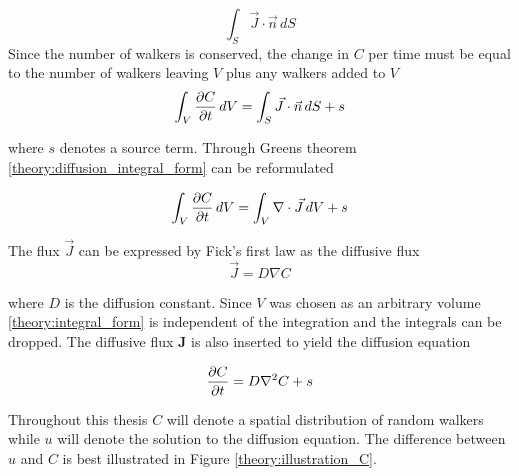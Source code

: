 \begin{equation}
 \int_S\vec{J}\cdot \vec{n}\,dS
\end{equation}
Since the number of walkers is conserved, the change in $C$ per time must be equal to the number of walkers leaving $V$ plus any walkers added to $V$
\begin{equation}\label{theory:diffusion_integral_form}
 \int_V \frac{\partial C}{\partial t}\,dV = \int_S\vec{J}\cdot \vec{n}\,dS + s
\end{equation}

\noindent where $s$ denotes a source term. 
Through Greens theorem \eqref{theory:diffusion_integral_form} can be reformulated

\begin{equation}\label{theory:integral_form}
 \int_V \frac{\partial C}{\partial t}\,dV = \int_V\nabla\cdot\vec{J}\,dV +s
\end{equation}

\noindent The flux $\vec{J}$ can be expressed by Fick's first law as the diffusive flux 
\begin{equation}
 \vec J = D\nabla C
\end{equation}

\noindent where $D$ is the diffusion constant. Since $V$ was chosen as an arbitrary volume \eqref{theory:integral_form} is independent of the integration and the integrals can be dropped. 
The diffusive flux $\mathbf{J}$ is also inserted to yield the diffusion equation

\begin{equation}\label{theory:diffusion_equation}
 \frac{\partial C}{\partial t} = D\nabla^2 C +s
\end{equation}

\noindent Throughout this thesis $C$ will denote a spatial distribution of random walkers while $u$ will denote the solution to the diffusion equation. 
The difference between $u$ and $C$ is best illustrated in Figure \ref{theory:illustration_C}.

